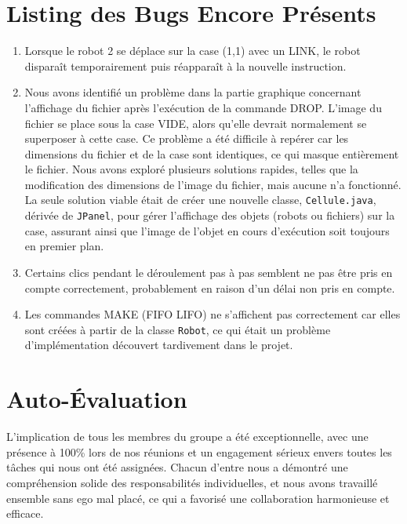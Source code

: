 \documentclass{article}
\begin{document}
\section{Listing des Bugs Encore Présents}
\begin{enumerate}
\item Lorsque le robot 2 se déplace sur la case (1,1) avec un LINK, le robot disparaît temporairement puis réapparaît à la nouvelle instruction.
\item Nous avons identifié un problème dans la partie graphique concernant l'affichage du fichier après l'exécution de la commande DROP. L'image du fichier se place sous la case VIDE, alors qu'elle devrait normalement se superposer à cette case. Ce problème a été difficile à repérer car les dimensions du fichier et de la case sont identiques, ce qui masque entièrement le fichier. Nous avons exploré plusieurs solutions rapides, telles que la modification des dimensions de l'image du fichier, mais aucune n'a fonctionné. La seule solution viable était de créer une nouvelle classe, \texttt{Cellule.java}, dérivée de \texttt{JPanel}, pour gérer l'affichage des objets (robots ou fichiers) sur la case, assurant ainsi que l'image de l'objet en cours d'exécution soit toujours en premier plan.
\item Certains clics pendant le déroulement pas à pas semblent ne pas être pris en compte correctement, probablement en raison d'un délai non pris en compte.
\item Les commandes MAKE (FIFO LIFO) ne s'affichent pas correctement car elles sont créées à partir de la classe \texttt{Robot}, ce qui était un problème d'implémentation découvert tardivement dans le projet.
\end{enumerate}


\section{Auto-Évaluation}

L'implication de tous les membres du groupe a été exceptionnelle, avec une présence à 100\% lors de nos réunions et un engagement sérieux envers toutes les tâches qui nous ont été assignées. Chacun d'entre nous a démontré une compréhension solide des responsabilités individuelles, et nous avons travaillé ensemble sans ego mal placé, ce qui a favorisé une collaboration harmonieuse et efficace.
\end{document}
